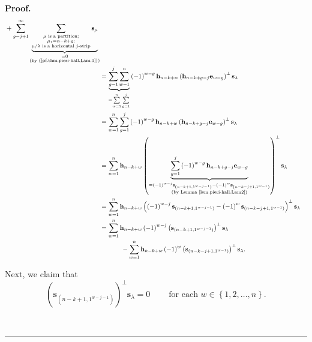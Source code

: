 \documentclass[numbers=enddot,12pt,final,onecolumn,notitlepage]{scrartcl}%
\theoremstyle{definition}
\newenvironment{proof}[1][Proof]{\noindent\textbf{#1.} }{\ \rule{0.5em}{0.5em}}
\let\sumnonlimits\sum
\renewcommand{\sum}{\sumnonlimits\limits}
\begin{document}
\begin{proof}
\begin{align}
{{}}+\sum_{g=j+1}^{\infty}\underbrace{\sum_{\substack{\mu\text{ is a
partition;}\\\mu_{1}=n-k+g;\\\mu/\lambda\text{ is a horizontal }%
j\text{-strip}}}\mathbf{s}_{\mu}}_{\substack{=0\\\text{(by
(\ref{pf.thm.pieri-hall.Lam.1}))}}}\nonumber\\
&  =\underbrace{\sum_{g=1}^{j}\sum_{w=1}^{n}}_{=\sum_{w=1}^{n}\sum_{g=1}^{j}%
}\left(  -1\right)  ^{w-g}\mathbf{h}_{n-k+w}\left(  \mathbf{h}_{n-k+g-j}%
\mathbf{e}_{w-g}\right)  ^{\perp}\mathbf{s}_{\lambda}\nonumber\\
&  =\sum_{w=1}^{n}\sum_{g=1}^{j}\left(  -1\right)  ^{w-g}\mathbf{h}%
_{n-k+w}\left(  \mathbf{h}_{n-k+g-j}\mathbf{e}_{w-g}\right)  ^{\perp
}\mathbf{s}_{\lambda}\nonumber\\
&  =\sum_{w=1}^{n}\mathbf{h}_{n-k+w}\left(  \underbrace{\sum_{g=1}^{j}\left(
-1\right)  ^{w-g}\mathbf{h}_{n-k+g-j}\mathbf{e}_{w-g}}_{\substack{=\left(
-1\right)  ^{w-j}\mathbf{s}_{\left(  n-k+1,1^{w-j-1}\right)  }-\left(
-1\right)  ^{w}\mathbf{s}_{\left(  n-k-j+1,1^{w-1}\right)  }\\\text{(by Lemma
\ref{lem.pieri-hall.Lam2})}}}\right)  ^{\perp}\mathbf{s}_{\lambda}\nonumber\\
&  =\sum_{w=1}^{n}\mathbf{h}_{n-k+w}\left(  \left(  -1\right)  ^{w-j}%
\mathbf{s}_{\left(  n-k+1,1^{w-j-1}\right)  }-\left(  -1\right)
^{w}\mathbf{s}_{\left(  n-k-j+1,1^{w-1}\right)  }\right)  ^{\perp}%
\mathbf{s}_{\lambda}\nonumber\\
&  =\sum_{w=1}^{n}\mathbf{h}_{n-k+w}\left(  -1\right)  ^{w-j}\left(
\mathbf{s}_{\left(  n-k+1,1^{w-j-1}\right)  }\right)  ^{\perp}\mathbf{s}%
_{\lambda}\nonumber\\
&  \ \ \ \ \ \ \ \ \ \ -\sum_{w=1}^{n}\mathbf{h}_{n-k+w}\left(  -1\right)
^{w}\left(  \mathbf{s}_{\left(  n-k-j+1,1^{w-1}\right)  }\right)  ^{\perp
}\mathbf{s}_{\lambda}. \label{pf.thm.pieri-hall.Lam.5}%
\end{align}


Next, we claim that%
\begin{equation}
\left(  \mathbf{s}_{\left(  n-k+1,1^{w-j-1}\right)  }\right)  ^{\perp
}\mathbf{s}_{\lambda}=0\ \ \ \ \ \ \ \ \ \ \text{for each }w\in\left\{
1,2,\ldots,n\right\}  . \label{pf.thm.pieri-hall.Lam.6}%
\end{equation}



\end{proof}
\end{document}
